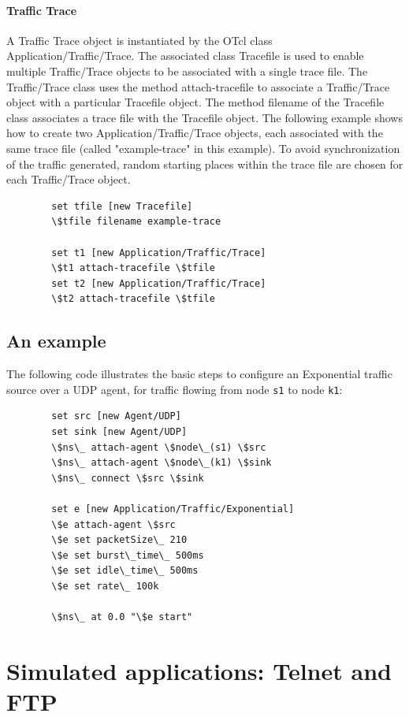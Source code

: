 \paragraph{Traffic Trace}
A Traffic Trace object is instantiated by the OTcl class 
Application/Traffic/Trace.
The associated class Tracefile is used to enable multiple 
Traffic/Trace objects to be associated with a single trace file.
The Traffic/Trace class uses the method attach-tracefile to associate
a Traffic/Trace object with a particular Tracefile object.
The method filename of the Tracefile class associates a trace file
with the Tracefile object.
The following example shows how to create two Application/Traffic/Trace objects,
each associated with the same trace file
(called "example-trace" in this example).
To avoid synchronization of the traffic generated,
random starting places within the trace file are chosen for
each Traffic/Trace object.
\begin{verbatim}
        set tfile [new Tracefile]
        \$tfile filename example-trace

        set t1 [new Application/Traffic/Trace]
        \$t1 attach-tracefile \$tfile
        set t2 [new Application/Traffic/Trace]
        \$t2 attach-tracefile \$tfile
\end{verbatim}

\subsection{An example}

The following code illustrates the basic steps to configure an Exponential
traffic source over a UDP agent, for traffic flowing from node {\tt s1} to 
node {\tt k1}:

\begin{verbatim}
        set src [new Agent/UDP]
        set sink [new Agent/UDP]
        \$ns\_ attach-agent \$node\_(s1) \$src
        \$ns\_ attach-agent \$node\_(k1) \$sink
        \$ns\_ connect \$src \$sink
	
        set e [new Application/Traffic/Exponential]
        \$e attach-agent \$src
        \$e set packetSize\_ 210
        \$e set burst\_time\_ 500ms
        \$e set idle\_time\_ 500ms
        \$e set rate\_ 100k

        \$ns\_ at 0.0 "\$e start"
\end{verbatim}

\section{Simulated applications:  Telnet and FTP}
\label{sec:simapps}
 
